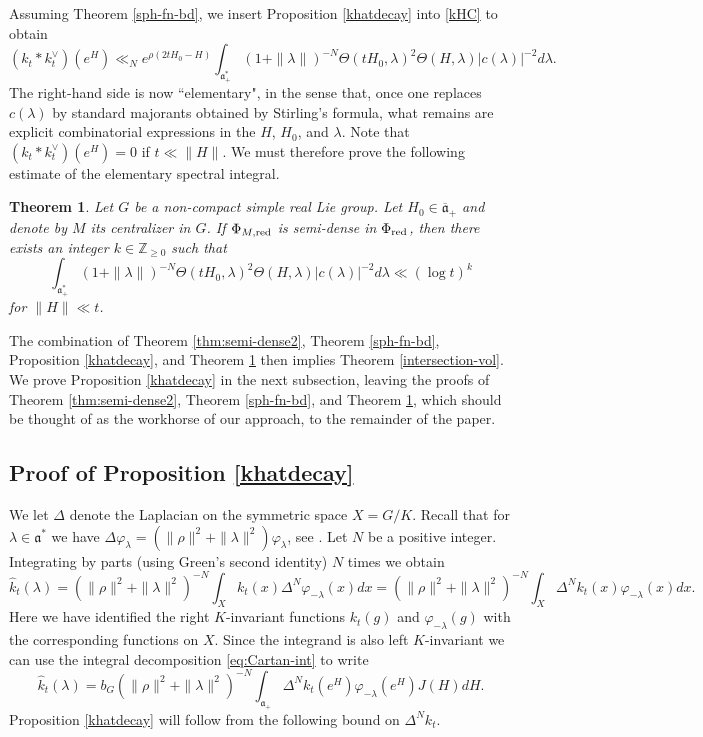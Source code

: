 \documentclass[12pt]{amsart}
\newtheorem{theorem}{Theorem}[section]
\theoremstyle{remark}
\newcommand{\Z}{\mathbb Z}
\newcommand{\ga}{\mathfrak a}
\newcommand{\be}{\begin{equation}}
\newcommand{\ee}{\end{equation}}
\begin{document}
Assuming Theorem \ref{sph-fn-bd}, we insert Proposition \ref{khatdecay} into \eqref{kHC} to obtain
\[
(k_t * k_t^\vee)(e^H) \ll_N e^{ \rho( 2tH_0 - H)} \int_{ \ga^{*}_+} (1 + \| \lambda \|)^{-N} \Theta(tH_0, \lambda)^2 \Theta( H, \lambda) |c(\lambda)|^{-2} d\lambda.
\]
The right-hand side is now ``elementary", in the sense that, once one replaces $c(\lambda)$ by standard majorants obtained by Stirling's formula, what remains are explicit combinatorial expressions in the $H$, $H_0$, and $\lambda$. Note that $(k_t * k_t^\vee)(e^H) = 0$ if $t \ll \|H\|$. We must therefore prove the following estimate of the elementary spectral integral.
\begin{theorem}\label{thm:elem-spec-int}
Let $G$ be a non-compact simple real Lie group. Let $H_0 \in\overline{\mathfrak{a}}_+$ and denote by $M$ its centralizer in $G$. If $\Phi_{M,\textnormal{red}}$ is semi-dense in $\Phi_{\textnormal{red}}$, then there exists an integer $k\in\Z_{\geq 0}$ such that
\be
\label{spectral-int-bd}
\int_{ \ga^{*}_+} (1 + \| \lambda \|)^{-N} \Theta(tH_0, \lambda)^2 \Theta( H, \lambda) |c(\lambda)|^{-2} d\lambda \ll (\log t)^k
\ee
%
for $\| H \| \ll t$.
\end{theorem}


The combination of Theorem \ref{thm:semi-dense2}, Theorem \ref{sph-fn-bd}, Proposition \ref{khatdecay}, and Theorem \ref{thm:elem-spec-int} then implies Theorem \ref{intersection-vol}. We prove Proposition \ref{khatdecay} in the next subsection, leaving the proofs of Theorem \ref{thm:semi-dense2}, Theorem \ref{sph-fn-bd}, and Theorem \ref{thm:elem-spec-int}, which should be thought of as the workhorse of our approach, to the remainder of the paper.


\subsection{Proof of Proposition \ref{khatdecay}}


We let $\Delta$ denote the Laplacian on the symmetric space $X=G/K$. Recall that for $\lambda\in\ga^*$ we have $\Delta\varphi_\lambda =(\|\rho\|^2+\|\lambda\|^2)\varphi_\lambda$, see \cite[p.427, (7)]{Helgason_00}. Let $N$ be a positive integer. Integrating by parts (using Green's second identity) $N$ times we obtain
\[
\widehat{k}_t(\lambda)=(\|\rho\|^2+\|\lambda\|^2)^{-N}\int_X k_t(x)\Delta^N\varphi_{-\lambda}(x)dx=(\|\rho\|^2+\|\lambda\|^2)^{-N}\int_X \Delta^N k_t(x)\varphi_{-\lambda}(x)dx.
\]
Here we have identified the right $K$-invariant functions $k_t(g)$ and $\varphi_{-\lambda}(g)$ with the corresponding functions on $X$. Since the integrand is also left $K$-invariant we can use the integral decomposition \eqref{eq:Cartan-int} to write
\begin{equation}\label{eq:IPP}
\widehat{k}_t(\lambda)=b_G(\|\rho\|^2+\|\lambda\|^2)^{-N}\int_{\ga_+} \Delta^N k_t(e^H)\varphi_{-\lambda}(e^H)J(H)dH.
\end{equation}
Proposition \ref{khatdecay} will follow from the following bound on $\Delta^Nk_t$.
\end{document}
